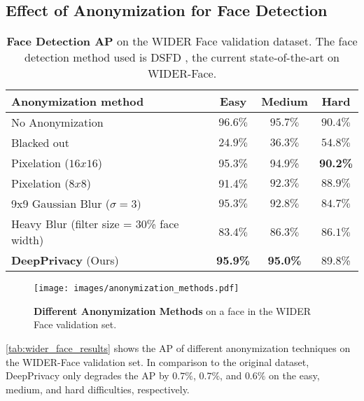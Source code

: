 \documentclass[runningheads]{llncs}
\begin{document}
\subsection{Effect of Anonymization for Face Detection}

\begin{table}
	\centering
	\caption[Average Precision on WIDER-Face validation set]{\textbf{Face Detection AP} on the WIDER Face \cite{yang2016wider} validation dataset. The face detection method used is DSFD \cite{li2018dsfd}, the current state-of-the-art on WIDER-Face. }
	\begin{tabular}{l|ccc}
		\hline
		Anonymization method & Easy & Medium & Hard \\
		\hline
		No Anonymization \cite{li2018dsfd} & $96.6\%$ & $95.7\%$  & $90.4\%$ \\
		\hline
		
		Blacked out & $24.9\%$ & $36.3\%$  & $54.8\%$ \\
		Pixelation ($16x16$) & 95.3\% & 94.9\% & \textbf{90.2\%} \\ 
		Pixelation ($8x8$) & 91.4\% & $92.3\%$ & $88.9\%$ \\ 
		9x9 Gaussian Blur ($\sigma = 3)$ & $95.3\%$ & $92.8\%$  & $84.7\%$ \\
		Heavy Blur (filter size = 30\% face width) & $83.4\%$ & $86.3\%$  & $86.1\%$ \\
		\textbf{DeepPrivacy} (Ours) & \textbf{95.9\%} & \textbf{95.0\%} & 89.8\% \\
		\hline
		
	\end{tabular}
	\vspace{2mm}

	\label{tab:wider_face_results}
\end{table}

\begin{figure}
    \centering
    \texttt{[image: images/anonymization\_methods.pdf]}
    \caption{\textbf{Different Anonymization Methods} on a face in the WIDER Face validation set.}
    \label{fig:anonymization_methods}
\end{figure}

\autoref{tab:wider_face_results} shows the AP of different anonymization techniques on the WIDER-Face validation set.
In comparison to the original dataset, DeepPrivacy only degrades the AP by $0.7\%$, $0.7\%$, and $0.6\%$ on the easy, medium, and hard difficulties, respectively.
\end{document}
